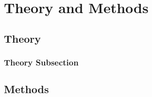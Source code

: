 \chapter{Theory and Methods} \label{ch:theory}

\section{Theory}
\label{sec:theory}

\subsection{Theory Subsection}\label{sec:theory-sub}

\section{Methods}
\label{sec:methods}
